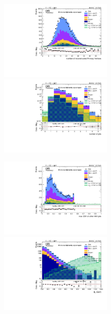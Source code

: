 \begin{figure}[!htb]
  \begin{center}  
    \includegraphics[width=0.495\textwidth]{plots/v9_U/XVZnnhpSR/nPV.pdf}
    \includegraphics[width=0.495\textwidth]{plots/v9_U/XVZnnhpSR/nJets.pdf}

    \includegraphics[width=0.495\textwidth]{plots/v9_U/XVZnnhpSR/MaxJetBTag.pdf}
    \includegraphics[width=0.495\textwidth]{plots/v9_U/XVZnnhpSR/MEt_pt.pdf}


\end{center}
\end{figure}
